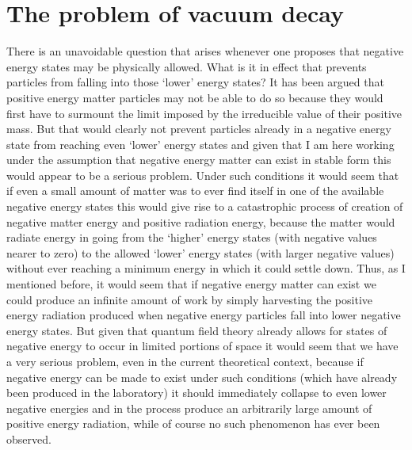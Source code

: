 \documentclass[notitlepage,12pt]{report}
\begin{document}
\section{The problem of vacuum decay}

There is an unavoidable question that arises whenever one proposes that negative energy states may be physically allowed. What is it in effect that prevents particles from falling into those `lower' energy states? It has been argued that positive energy matter particles may not be able to do so because they would first have to surmount the limit imposed by the irreducible value of their positive mass. But that would clearly not prevent particles already in a negative energy state from reaching even `lower' energy states and given that I am here working under the assumption that negative energy matter can exist in stable form this would appear to be a serious problem. Under such conditions it would seem that if even a small amount of matter was to ever find itself in one of the available negative energy states this would give rise to a catastrophic process of creation of negative matter energy and positive radiation energy, because the matter would radiate energy in going from the `higher' energy states (with negative values nearer to zero) to the allowed `lower' energy states (with larger negative values) without ever reaching a minimum energy in which it could settle down. Thus, as I mentioned before, it would seem that if negative energy matter can exist we could produce an infinite amount of work by simply harvesting the positive energy radiation produced when negative energy particles fall into lower negative energy states. But given that quantum field theory already allows for states of negative energy to occur in limited portions of space it would seem that we have a very serious problem, even in the current theoretical context, because if negative energy can be made to exist under such conditions (which have already been produced in the laboratory) it should immediately collapse to even lower negative energies and in the process produce an arbitrarily large amount of positive energy radiation, while of course no such phenomenon has ever been observed.
\end{document}
